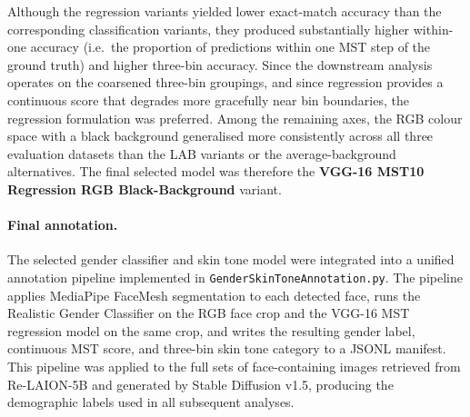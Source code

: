 Although the regression variants yielded lower exact-match accuracy than the corresponding classification variants, they produced substantially higher within-one accuracy (i.e.\ the proportion of predictions within one MST step of the ground truth) and higher three-bin accuracy. Since the downstream analysis operates on the coarsened three-bin groupings, and since regression provides a continuous score that degrades more gracefully near bin boundaries, the regression formulation was preferred. Among the remaining axes, the RGB colour space with a black background generalised more consistently across all three evaluation datasets than the LAB variants or the average-background alternatives. The final selected model was therefore the \textbf{VGG-16 MST10 Regression RGB Black-Background} variant.

\paragraph{Final annotation.}
The selected gender classifier and skin tone model were integrated into a unified annotation pipeline implemented in \texttt{GenderSkinToneAnnotation.py}. The pipeline applies MediaPipe FaceMesh segmentation to each detected face, runs the Realistic Gender Classifier on the RGB face crop and the VGG-16 MST regression model on the same crop, and writes the resulting gender label, continuous MST score, and three-bin skin tone category to a JSONL manifest. This pipeline was applied to the full sets of face-containing images retrieved from Re-LAION-5B and generated by Stable Diffusion v1.5, producing the demographic labels used in all subsequent analyses.